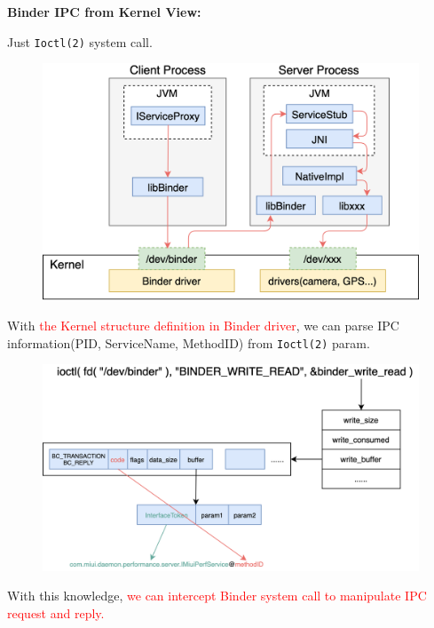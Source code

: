 \documentclass[notheorems, aspectratio=54]{beamer}
\begin{document}
\begin{frame}
	
	\textbf{Binder IPC from Kernel View:}
	
	Just \texttt{Ioctl(2)} system call. 
	
	\begin{figure}
		\centering
		\includegraphics[width=\textwidth]{res/binder-internal.png}
	\end{figure}

\end{frame}

\begin{frame}
	
	With \textcolor{red}{the Kernel structure definition in Binder driver}, we can parse IPC information(PID, ServiceName, MethodID) from \texttt{Ioctl(2)} param.
	
	\begin{figure}
		\centering
		\includegraphics[width=\textwidth]{res/binder-structure.png}
	\end{figure}
	
	With this knowledge, \textcolor{red}{we can intercept Binder system call to manipulate IPC request and reply.} 
\end{frame}
\end{document}
